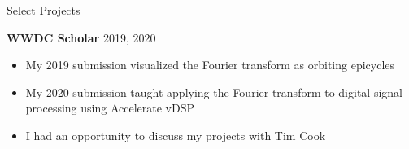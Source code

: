 \documentclass{resume}
\newif\ifisDigital
\begin{document}
\begin{rSection}{Select Projects}


\item \textbf{WWDC Scholar} {2019, 2020}
\ifisDigital
\hfill
\href{https://liamrosenfeld.com/projects/fourier-artist/}{2019 Writeup,}
\href{https://liamrosenfeld.com/projects/stfourier-explainer/}{2020 Writeup}
\fi
\begin{itemize}
    \itemsep -3pt {} 
    \vspace{-0.35em}
    \item My 2019 submission visualized the Fourier transform as orbiting epicycles
    \item My 2020 submission taught applying the Fourier transform to digital signal processing using Accelerate vDSP
    \item I had an opportunity to discuss my projects with Tim Cook
\end{itemize}
 
\end{rSection} 
\end{document}
